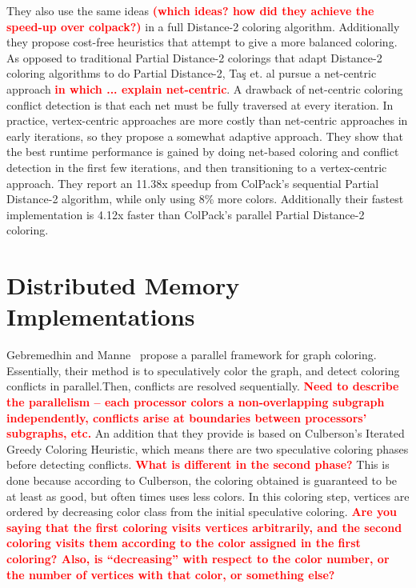 \documentclass{article}
\newcommand{\todo}[1]{\textcolor{red}{\bf #1}}
\begin{document}
{{They also use the same
ideas \todo{(which ideas? how did they achieve the speed-up over colpack?)} in a full Distance-2 coloring algorithm. Additionally they propose cost-free heuristics that 
attempt to give a more balanced coloring. As opposed to traditional Partial Distance-2 colorings that
adapt Distance-2 coloring algorithms to do Partial Distance-2, Ta{\c{s}} et. al pursue a 
 net-centric approach \todo{in which ... explain net-centric}. A drawback of net-centric coloring conflict detection is that each net must be 
fully traversed at every iteration. In practice, vertex-centric approaches are more costly than 
net-centric approaches in early iterations, so they propose a somewhat adaptive approach. They show 
that the best runtime performance is gained by doing net-based coloring and conflict detection in 
the first few iterations, and then transitioning to a vertex-centric approach. They report an 11.38x 
speedup from ColPack's sequential Partial Distance-2 algorithm, while only using 8\% more colors. 
Additionally their fastest implementation is 4.12x faster than ColPack's parallel Partial Distance-2 
coloring.

\section{Distributed Memory Implementations}

Gebremedhin and Manne~\cite{gebremedhin2000scalable} propose a parallel framework for graph coloring.
Essentially, their method is to speculatively color the graph, and detect coloring conflicts in parallel.Then, conflicts are resolved sequentially.  
\todo{Need to describe the parallelism -- each processor colors a 
non-overlapping subgraph independently, conflicts arise at boundaries between
processors' subgraphs, etc.}
An addition that they provide is based on Culberson's 
Iterated Greedy Coloring Heuristic\todo{\cite{Culberson}}, which means there are two speculative coloring phases before 
detecting conflicts. \todo{What is different in the second phase?} This is done because according to Culberson, the coloring obtained is guaranteed to
be at least as good, but often times uses less colors. In this coloring step, vertices are ordered by
decreasing color class from the initial speculative coloring.
\todo{Are you saying that the first coloring visits vertices arbitrarily, 
and the second coloring visits them according to the color assigned in the first
coloring?  Also, is ``decreasing'' with respect to the color number, or the 
number of vertices with that color, or something else?}

}}
\end{document}
